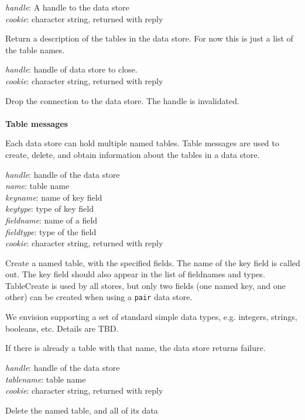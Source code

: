 {
\metP
    {\em handle}: A handle to the data store\\
    {\em cookie}: character string, returned with reply

\metD
    Return a description of the tables in the data store. For now this
    is just a list of the table names.
}


{
\metP
    {\em handle}: handle of data store to close.\\
    {\em cookie}: character string, returned with reply

\metD
    Drop the connection to the data store. The handle is invalidated.
}

\paragraph{}
{\bf Table messages}

Each data store can hold multiple named tables. Table messages are used to
create, delete, and obtain information about the tables in a data store.

{
\metP
    {\em handle}: handle of the data store\\
    {\em name}: table name\\
    {\em keyname}: name of key field\\
    {\em keytype}: type of key field\\
    {\em fieldname}: name of a field\\
    {\em fieldtype}: type of the field\\
    {\em cookie}: character string, returned with reply

\metD
    Create a named table, with the specified fields. The name of the
    key field is called out.  The key field should also appear
    in the list of fieldnames and types. TableCreate is used by all
    stores, but only two fields (one named key, and one other) can be
    created when using a {\tt pair} data store. 

    We envision supporting a set of standard simple data types, e.g.
    integers, strings, booleans, etc. Details are TBD.
    
    If there is already a table with that name, the data store returns
    failure.
}

{
\metP
    {\em handle}: handle of the data store\\
    {\em tablename}: table name\\
    {\em cookie}: character string, returned with reply

\metD
    Delete the named table, and all of its data
}

